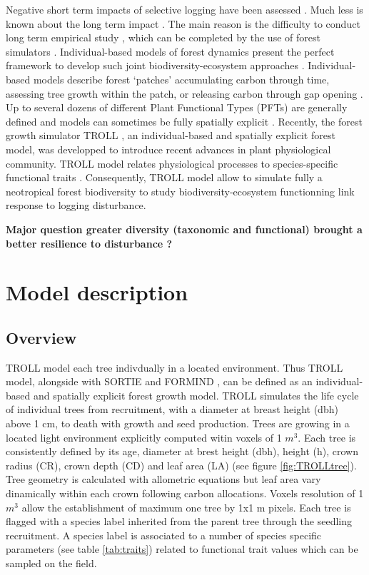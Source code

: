 \documentclass[]{article}
\let\oldsection\section
\renewcommand\section{\newpage\oldsection}
\theoremstyle{definition}
\theoremstyle{definition}
\theoremstyle{remark}
\begin{document}
Negative short term impacts of selective logging have been assessed
\citetext{\citealp{Carreno-Rocabado2012}; \citealp{DeAvila2015}; \citealp[but
see][]{Martin2015}}. Much less is known about the long term impact
\citep{Osazuwa-Peters2015}. The main reason is the difficulty to conduct
long term empirical study \citep[but see][]{Herault2010}, which can be
completed by the use of forest simulators
\citep{Huth2004, Khler2004, Ruger2008, Tietjen2006}. Individual-based
models of forest dynamics present the perfect framework to develop such
joint biodiversity-ecosystem approaches \citep{Li}. Individual-based
models describe forest `patches' accumulating carbon through time,
assessing tree growth within the patch, or releasing carbon through gap
opening \citep{Bugmann2001}. Up to several dozens of different Plant
Functional Types (PFTs) are generally defined and models can sometimes
be fully spatially explicit \citep{Pacala1996}. Recently, the forest
growth simulator TROLL \citep{Chave1999}, an individual-based and
spatially explicit forest model, was developped to introduce recent
advances in plant physiological community. TROLL model relates
physiological processes to species-specific functional traits
\citep{Li}. Consequently, TROLL model allow to simulate fully a
neotropical forest biodiversity to study biodiversity-ecosystem
functionning link response to logging disturbance.

\textbf{Major question greater diversity (taxonomic and functional)
brought a better resilience to disturbance ?}

\section{Model description}\label{model-description}

\subsection{Overview}\label{overview}

TROLL model each tree indivdually in a located environment. Thus TROLL
model, alongside with SORTIE \citep{Pacala1996, Uriarte2009} and FORMIND
\citep{Fischer2016, Kohler1998}, can be defined as an individual-based
and spatially explicit forest growth model. TROLL simulates the life
cycle of individual trees from recruitment, with a diameter at breast
height (dbh) above 1 cm, to death with growth and seed production. Trees
are growing in a located light environment explicitly computed witin
voxels of 1 \(m^3\). Each tree is consistently defined by its age,
diameter at brest height (dbh), height (h), crown radius (CR), crown
depth (CD) and leaf area (LA) (see figure \ref{fig:TROLLtree}). Tree
geometry is calculated with allometric equations but leaf area vary
dinamically within each crown following carbon allocations. Voxels
resolution of 1 \(m^3\) allow the establishment of maximum one tree by
1x1 m pixels. Each tree is flagged with a species label inherited from
the parent tree through the seedling recruitment. A species label is
associated to a number of species specific parameters (see table
\ref{tab:traits}) related to functional trait values which can be
sampled on the field.
\end{document}
